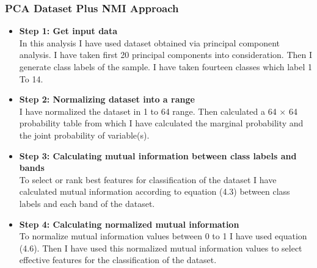 \documentclass[document.tex]{subfiles}
\begin{document}
\subsubsection{PCA Dataset Plus NMI Approach}
\begin{itemize}
	\item \textbf{Step 1: Get input data}\\
	In this analysis I have used dataset obtained via principal component analysis. I have taken first 20 principal components into consideration. Then I generate class labels of the sample. I have taken
	fourteen classes which label 1 To 14.
	\item \textbf{Step 2: Normalizing dataset into a range}\\
	I have normalized the dataset in 1 to 64 range. Then calculated a 64 $\times$ 64 probability table from which I have calculated the marginal probability and the joint probability of variable(s). 
	\item \textbf{Step 3: Calculating mutual information between class labels and bands}\\
	To select or rank best features for classification of the dataset I have calculated mutual information according to equation (4.3) between class labels and each band of the dataset.
	\item \textbf{Step 4: Calculating normalized mutual information}\\
	To normalize mutual information values between 0 to 1 I have used equation (4.6). Then I have used this normalized mutual information values to select effective features for the classification of the dataset. 
\end{itemize}
\end{document}

